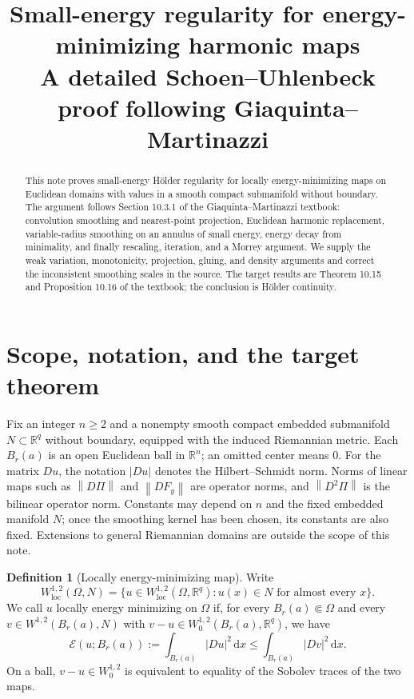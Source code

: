 \documentclass[11pt,a4paper]{article}
\title{Small-energy regularity for energy-minimizing harmonic maps\\\large A detailed Schoen--Uhlenbeck proof following Giaquinta--Martinazzi}
\author{}
\date{}
\numberwithin{equation}{section}
\theoremstyle{definition}
\newtheorem{definition}[theorem]{Definition}
\newcommand{\R}{\mathbb R}
\newcommand{\dd}{\,\mathrm d}
\newcommand{\dx}{\dd x}
\newcommand{\W}{W^{1,2}}
\newcommand{\Wo}{W^{1,2}_0}
\newcommand{\E}{\mathcal E}
\newcommand{\norm}[1]{\left\lVert #1\right\rVert}
\begin{document}
\maketitle

\begin{abstract}
This note proves small-energy Hölder regularity for locally energy-minimizing maps on Euclidean domains with values in a smooth compact submanifold without boundary. The argument follows Section 10.3.1 of the Giaquinta--Martinazzi textbook: convolution smoothing and nearest-point projection, Euclidean harmonic replacement, variable-radius smoothing on an annulus of small energy, energy decay from minimality, and finally rescaling, iteration, and a Morrey argument. We supply the weak variation, monotonicity, projection, gluing, and density arguments and correct the inconsistent smoothing scales in the source. The target results are Theorem 10.15 and Proposition 10.16 of the textbook; the conclusion is Hölder continuity.
\end{abstract}

\section{Scope, notation, and the target theorem}

Fix an integer $n\ge2$ and a nonempty smooth compact embedded submanifold $N\subset\R^q$ without boundary, equipped with the induced Riemannian metric. Each $B_r(a)$ is an open Euclidean ball in $\R^n$; an omitted center means $0$. For the matrix $Du$, the notation $|Du|$ denotes the Hilbert--Schmidt norm. Norms of linear maps such as $\norm{D\Pi}$ and $\norm{DF_y}$ are operator norms, and $\norm{D^2\Pi}$ is the bilinear operator norm. Constants may depend on $n$ and the fixed embedded manifold $N$; once the smoothing kernel has been chosen, its constants are also fixed. Extensions to general Riemannian domains are outside the scope of this note.

\begin{definition}[Locally energy-minimizing map]
Write
\[
\W_{\mathrm{loc}}(\Omega,N)
=\{u\in\W_{\mathrm{loc}}(\Omega,\R^q):u(x)\in N\text{ for almost every }x\}.
\]
We call $u$ locally energy minimizing on $\Omega$ if, for every $B_r(a)\Subset\Omega$ and every $v\in\W(B_r(a),N)$ with $v-u\in\Wo(B_r(a),\R^q)$, we have
\[
\E(u;B_r(a)):=\int_{B_r(a)}|Du|^2\dx
\le\int_{B_r(a)}|Dv|^2\dx.
\]
On a ball, $v-u\in\Wo$ is equivalent to equality of the Sobolev traces of the two maps.
\end{definition}
\end{document}
